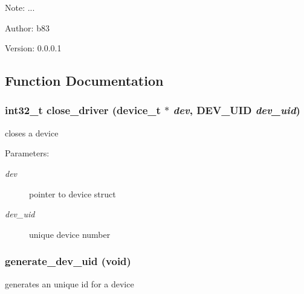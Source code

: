 \begin{Desc}
\item[Note:]... \end{Desc}
\begin{Desc}
\item[Author:]b83 \end{Desc}
\begin{Desc}
\item[Version:]0.0.0.1 \end{Desc}


\subsection{Function Documentation}
\hypertarget{group__device__driver_g4915a14d06f79d1c5a2d72b186cee40d}{
\subsubsection[{close\_\-driver}]{\setlength{\rightskip}{0pt plus 5cm}int32\_\-t close\_\-driver (device\_\-t $\ast$ {\em dev}, \/  {\bf DEV\_\-UID} {\em dev\_\-uid})}}
\label{group__device__driver_g4915a14d06f79d1c5a2d72b186cee40d}


closes a device 

\begin{Desc}
\item[Parameters:]
\begin{description}
\item[{\em dev}]pointer to device struct \item[{\em dev\_\-uid}]unique device number \end{description}
\end{Desc}
\hypertarget{group__device__driver_g66f128d4bb74eca88758ca73f2fa4f9c}{
\subsubsection[{generate\_\-dev\_\-uid}]{ generate\_\-dev\_\-uid (void)}}
\label{group__device__driver_g66f128d4bb74eca88758ca73f2fa4f9c}


generates an unique id for a device 

